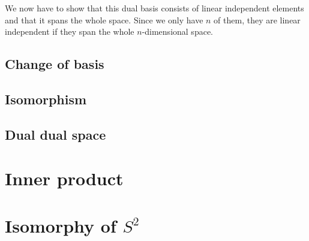 \documentclass[11pt, english, fleqn, DIV=15, headinclude, BCOR=1cm]{scrartcl}
\begin{document}
We now have to show that this dual basis consists of linear independent
elements and that it spans the whole space. Since we only have $n$ of them,
they are linear independent if they span the whole $n$-dimensional space.

\subsection{Change of basis}

\subsection{Isomorphism}

\subsection{Dual dual space}

\section{Inner product}

\section{Isomorphy of $S^2$}
\end{document}
